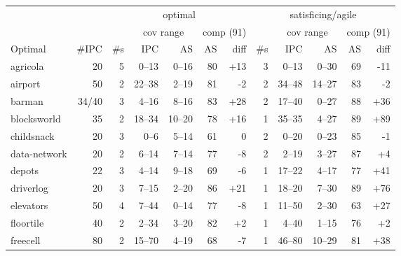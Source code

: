\documentclass{article}
\begin{document}
            \begin{table} \centering
            \begin{tabular}{l@{}rr|rrrr|r|rrrr}
& & \multicolumn{5}{c}{optimal} & \multicolumn{5}{c}{satisficing/agile} \\

& & & \multicolumn{2}{c}{cov range} & \multicolumn{2}{c}{comp (91)} & & \multicolumn{2}{c}{cov range} & \multicolumn{2}{c}{comp (91)} \\

       Optimal &  \#IPC & \#s &      IPC &      AS &  AS &               diff & \#s &       IPC &      AS &  AS &               diff \\
\midrule
      agricola &     20 &   5 &    0--13 &   0--16 &  80 &  {\color{blue}+13} &   3 &     0--13 &   0--30 &  69 &   {\color{red}-11} \\
       airport &     50 &   2 &   22--38 &   2--19 &  81 &    {\color{red}-2} &   2 &    34--48 &  14--27 &  83 &    {\color{red}-2} \\
        barman &  34/40 &   3 &    4--16 &   8--16 &  83 &  {\color{blue}+28} &   2 &    17--40 &   0--27 &  88 &  {\color{blue}+36} \\
   blocksworld &     35 &   2 &   18--34 &  10--20 &  78 &  {\color{blue}+16} &   1 &    35--35 &   4--27 &  89 &  {\color{blue}+89} \\
    childsnack &     20 &   3 &     0--6 &   5--14 &  61 &                  0 &   2 &     0--20 &   0--23 &  85 &    {\color{red}-1} \\
  data-network &     20 &   2 &    6--14 &   7--14 &  77 &    {\color{red}-8} &   2 &     2--19 &   3--27 &  87 &   {\color{blue}+4} \\
        depots &     22 &   3 &    4--14 &   9--18 &  69 &    {\color{red}-6} &   1 &    17--22 &   4--17 &  77 &  {\color{blue}+41} \\
     driverlog &     20 &   3 &    7--15 &   2--20 &  86 &  {\color{blue}+21} &   1 &    18--20 &   7--30 &  89 &  {\color{blue}+76} \\
     elevators &     50 &   4 &    7--44 &   0--14 &  77 &    {\color{red}-8} &   1 &    11--50 &   2--30 &  63 &  {\color{blue}+27} \\
     floortile &     40 &   2 &    2--34 &   3--20 &  82 &   {\color{blue}+2} &   1 &     4--40 &   1--15 &  76 &   {\color{blue}+2} \\
      freecell &     80 &   2 &   15--70 &   4--19 &  68 &    {\color{red}-7} &   1 &    46--80 &  10--29 &  81 &  {\color{blue}+38} \\

\end{tabular}
\end{table}
\end{document}
